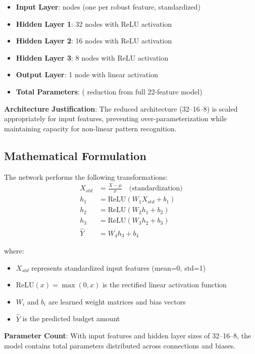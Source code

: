 \begin{itemize}
    \item \textbf{Input Layer}: \ModelTenInputDimension{} nodes (one per robust feature, standardized)
    \item \textbf{Hidden Layer 1}: 32 nodes with ReLU activation
    \item \textbf{Hidden Layer 2}: 16 nodes with ReLU activation
    \item \textbf{Hidden Layer 3}: 8 nodes with ReLU activation
    \item \textbf{Output Layer}: 1 node with linear activation
    \item \textbf{Total Parameters}: \ModelTenTotalParams{} (\ModelTenParameterReduction{} reduction from full 22-feature model)
\end{itemize}

\textbf{Architecture Justification}: The reduced architecture (32--16--8) is scaled appropriately for \ModelTenRobustFeatures{} input features, preventing over-parameterization while maintaining capacity for non-linear pattern recognition.

\subsection{Mathematical Formulation}

The network performs the following transformations:
\begin{align}
X_{std} &= \frac{X - \mu}{\sigma} \quad \text{(standardization)} \\
h_1 &= \text{ReLU}(W_1 X_{std} + b_1) \\
h_2 &= \text{ReLU}(W_2 h_1 + b_2) \\
h_3 &= \text{ReLU}(W_3 h_2 + b_3) \\
\hat{Y} &= W_4 h_3 + b_4
\end{align}

where:
\begin{itemize}
    \item $X_{std}$ represents standardized input features (mean=0, std=1)
    \item $\text{ReLU}(x) = \max(0, x)$ is the rectified linear activation function
    \item $W_i$ and $b_i$ are learned weight matrices and bias vectors
    \item $\hat{Y}$ is the predicted budget amount
\end{itemize}

\textbf{Parameter Count}: With \ModelTenRobustFeatures{} input features and hidden layer sizes of 32--16--8, the model contains \ModelTenTotalParams{} total parameters distributed across connections and biases.

